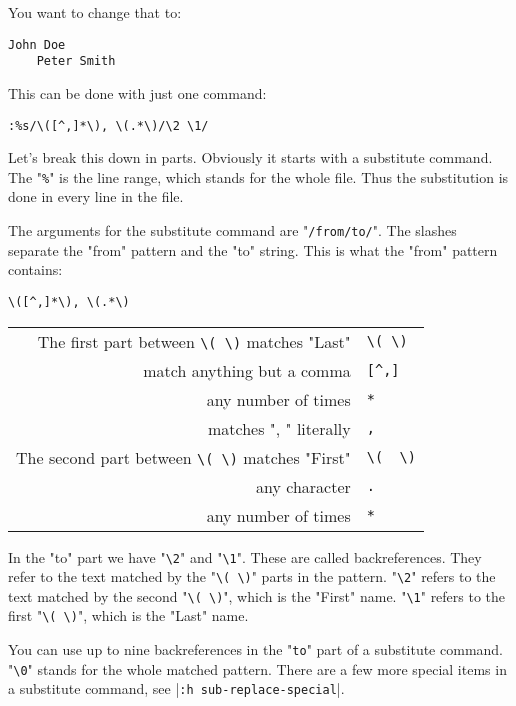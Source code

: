You want to change that to:

\begin{Verbatim}[samepage=true]
    John Doe 
    Peter Smith 
\end{Verbatim}

This can be done with just one command:

\begin{Verbatim}[samepage=true]
 :%s/\([^,]*\), \(.*\)/\2 \1/
\end{Verbatim}

Let's break this down in parts.
Obviously it starts with a substitute command.
The "\verb!%!" is the line range, which stands for the whole file.
Thus the substitution is done in every line in the file.

The arguments for the substitute command are "\verb!/from/to/!".
The slashes separate the "from" pattern and the "to" string.
This is what the "from" pattern contains:

\begin{Verbatim}[samepage=true]
	\([^,]*\), \(.*\) 
\end{Verbatim}

\begin{center}
				\begin{longtable}{r l}
								The first part between \verb!\( \)! matches "Last" & \verb!\( \)! \\
								match anything but a comma & \verb![^,]! \\
								any number of times & \verb!*! \\
								matches ", " literally & \verb!,! \\
								The second part between \verb!\( \)! matches "First" & \verb!\(  \)! \\
								any character & \verb!.! \\
								any number of times & \verb!*! \\
				\end{longtable}
\end{center}

In the "to" part we have "\verb!\2!" and "\verb!\1!".
These are called backreferences.
They refer to the text matched by the "\verb!\( \)!" parts in the pattern.
"\verb!\2!" refers to the text matched by the second "\verb!\( \)!", which is the "First" name.
"\verb!\1!" refers to the first "\verb!\( \)!", which is the "Last" name.

You can use up to nine backreferences in the "\verb!to!" part of a substitute command.
"\verb!\0!" stands for the whole matched pattern.
There are a few more special items in a substitute command, see |\verb!:h sub-replace-special!|.
